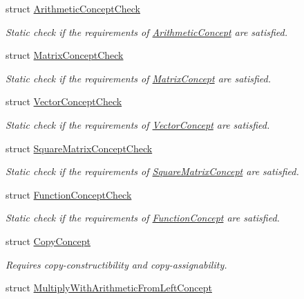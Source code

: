 \begin{DoxyCompactItemize}
struct \hyperlink{structFunG_1_1Concepts_1_1ArithmeticConceptCheck}{Arithmetic\-Concept\-Check}
\begin{DoxyCompactList}\small\item\em Static check if the requirements of \hyperlink{structFunG_1_1Concepts_1_1ArithmeticConcept}{Arithmetic\-Concept} are satisfied. \end{DoxyCompactList}\item 
struct \hyperlink{structFunG_1_1Concepts_1_1MatrixConceptCheck}{Matrix\-Concept\-Check}
\begin{DoxyCompactList}\small\item\em Static check if the requirements of \hyperlink{structFunG_1_1Concepts_1_1MatrixConcept}{Matrix\-Concept} are satisfied. \end{DoxyCompactList}\item 
struct \hyperlink{structFunG_1_1Concepts_1_1VectorConceptCheck}{Vector\-Concept\-Check}
\begin{DoxyCompactList}\small\item\em Static check if the requirements of \hyperlink{structFunG_1_1Concepts_1_1VectorConcept}{Vector\-Concept} are satisfied. \end{DoxyCompactList}\item 
struct \hyperlink{structFunG_1_1Concepts_1_1SquareMatrixConceptCheck}{Square\-Matrix\-Concept\-Check}
\begin{DoxyCompactList}\small\item\em Static check if the requirements of \hyperlink{structFunG_1_1Concepts_1_1SquareMatrixConcept}{Square\-Matrix\-Concept} are satisfied. \end{DoxyCompactList}\item 
struct \hyperlink{structFunG_1_1Concepts_1_1FunctionConceptCheck}{Function\-Concept\-Check}
\begin{DoxyCompactList}\small\item\em Static check if the requirements of \hyperlink{structFunG_1_1Concepts_1_1FunctionConcept}{Function\-Concept} are satisfied. \end{DoxyCompactList}\item 
struct \hyperlink{structFunG_1_1Concepts_1_1CopyConcept}{Copy\-Concept}
\begin{DoxyCompactList}\small\item\em Requires copy-\/constructibility and copy-\/assignability. \end{DoxyCompactList}\item 
struct \hyperlink{structFunG_1_1Concepts_1_1MultiplyWithArithmeticFromLeftConcept}{Multiply\-With\-Arithmetic\-From\-Left\-Concept}

\end{DoxyCompactItemize}
